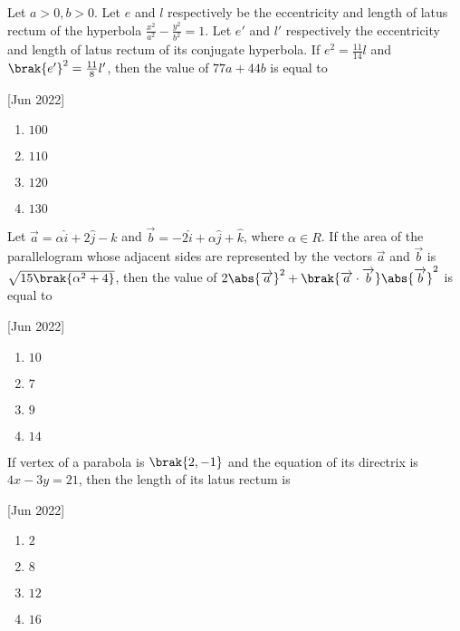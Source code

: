     \item Let $a>0, b>0$. Let $e$ and $l$ respectively be the eccentricity and length of latus rectum of the hyperbola $\frac{x^2}{a^2}-\frac{y^2}{b^2}=1$. Let $e'$ and $l'$ respectively the eccentricity and length of latus rectum of its conjugate hyperbola. If $e^2=\frac{11}{14}l$ and $\brak{e'}^2=\frac{11}{8}l'$, then the value of $77a+44b$ is equal to
    
    \hfill[Jun 2022]

        \begin{multicols}{4}
            \begin{enumerate}
                \item $100$
                \item $110$
                \item $120$
                \item $130$
            \end{enumerate}
        \end{multicols}

    \item Let $\overrightarrow{a}=\alpha \hat{i}+2\hat{j}-\hat{k}$ and $\overrightarrow{b}=-2\hat{i}+\alpha\hat{j}+\hat{k}$, where $\alpha\in R$. If the area of the parallelogram whose adjacent sides are represented by the vectors $\overrightarrow{a}$ and $\overrightarrow{b}$ is $\sqrt{15\brak{\alpha^2+4}}$, then the value of $2\abs{\overrightarrow{a}}^2+\brak{\overrightarrow{a}\cdot\overrightarrow{b}}\abs{\overrightarrow{b}}^2$ is equal to
    
    \hfill[Jun 2022]

        \begin{multicols}{4}
            \begin{enumerate}
                \item $10$
                \item $7$
                \item $9$
                \item $14$
            \end{enumerate}
        \end{multicols}

    \item If vertex of a parabola is $\brak{2,-1}$ and the equation of its directrix is $4x-3y=21$, then the length of its latus rectum is
    
    \hfill[Jun 2022]
    
        \begin{multicols}{4}
            \begin{enumerate}
                \item $2$
                \item $8$
                \item $12$
                \item $16$
            \end{enumerate}
        \end{multicols}

